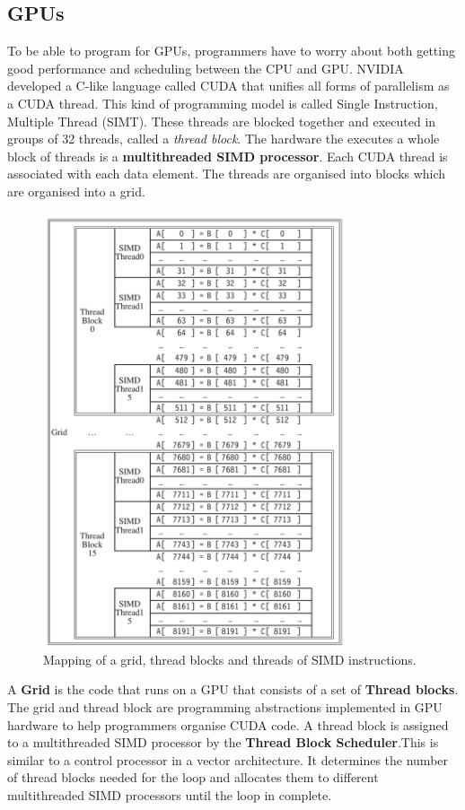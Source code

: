 \documentclass[11pt]{article}
\begin{document}
\subsection{GPUs}
To be able to program for GPUs, programmers have to worry about both getting good performance and scheduling between the CPU and GPU. NVIDIA developed a C-like language called CUDA that unifies all forms of parallelism as a CUDA thread. This kind of programming model is called Single Instruction, Multiple Thread (SIMT). These threads are blocked together and executed in groups of 32 threads, called a \textit{thread block}. The hardware the executes a whole block of threads is a \textbf{multithreaded SIMD processor}. 
\n
Each CUDA thread is associated with each data element. The threads are organised into blocks which are organised into a grid. 
\begin{figure}[H]
\centering
\includegraphics[width=0.8\textwidth, keepaspectratio]{imgs/cuda-grid.png}
\caption{Mapping of a grid, thread blocks and threads of SIMD instructions.}
\end{figure}
\noindent
A \textbf{Grid} is the code that runs on a GPU that consists of a set of \textbf{Thread blocks}. The grid and thread block are programming abstractions implemented in GPU hardware to help programmers organise CUDA code. A thread block is assigned to a multithreaded SIMD processor by the \textbf{Thread Block Scheduler}.This is similar to a control processor in a vector architecture. It determines the number of thread blocks needed for the loop and allocates them to different multithreaded SIMD processors until the loop in complete. 
\end{document}
